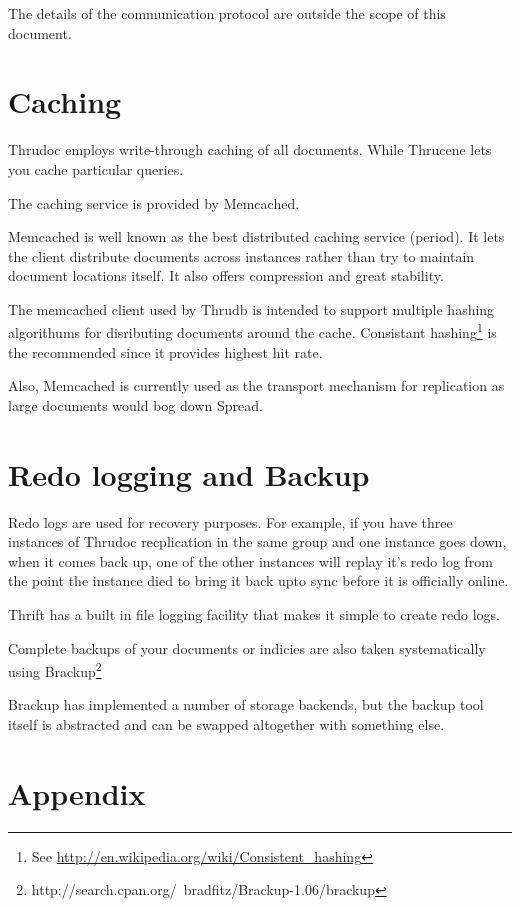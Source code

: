 \documentclass[nocopyrightspace,blockstyle]{sigplanconf}
\begin{document}
The details of the communication protocol are outside the scope of this document. 

\section{Caching}

Thrudoc employs write-through caching of all documents. While Thrucene lets you cache particular queries.

The caching service is provided by Memcached.  

Memcached is well known as the best distributed caching service (period).  
It lets the client distribute documents across instances rather than try to maintain document locations itself. 
It also offers compression and great stability.
   
The memcached client used by Thrudb is intended to support multiple hashing algorithums for disributing documents around the cache.
Consistant hashing\footnote{See \url{http://en.wikipedia.org/wiki/Consistent_hashing}} is the recommended since it provides highest hit rate. 

Also, Memcached is currently used as the transport mechanism for replication as large documents would bog down Spread.

\section{Redo logging and Backup}

Redo logs are used for recovery purposes.  
For example, if you have three instances of Thrudoc recplication in the same group and one instance goes down, when it comes back up, 
one of the other instances will replay it's redo log from the point the instance died to bring it back upto sync before it is
officially online.
  
Thrift has a built in file logging facility that makes it simple to create redo logs.

Complete backups of your documents or indicies are also taken systematically using Brackup\footnote{http://search.cpan.org/~bradfitz/Brackup-1.06/brackup}

Brackup has implemented a number of storage backends, but the backup tool itself is abstracted and can be swapped altogether with something else. 

\section{Appendix}
\end{document}
